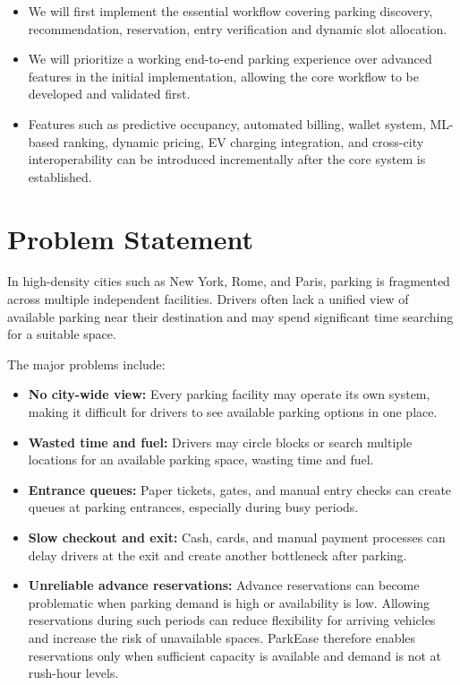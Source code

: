\documentclass[12pt,a4paper]{article}
\begin{document}
\begin{itemize}
    \item We will first implement the essential workflow covering parking discovery, recommendation, reservation, entry verification and dynamic slot allocation.

    \item We will prioritize a working end-to-end parking experience over advanced features in the initial implementation, allowing the core workflow to be developed and validated first.

    \item Features such as predictive occupancy, automated billing, wallet system, ML-based ranking, dynamic pricing, EV charging integration, and cross-city interoperability can be introduced incrementally after the core system is established.
\end{itemize}

\newpage
\section{Problem Statement}

In high-density cities such as New York, Rome, and Paris, parking is fragmented across multiple independent facilities. Drivers often lack a unified view of available parking near their destination and may spend significant time searching for a suitable space.

The major problems include:

\begin{itemize}
    \item \textbf{No city-wide view:} Every parking facility may operate its own system, making it difficult for drivers to see available parking options in one place.

    \item \textbf{Wasted time and fuel:} Drivers may circle blocks or search multiple locations for an available parking space, wasting time and fuel.

    \item \textbf{Entrance queues:} Paper tickets, gates, and manual entry checks can create queues at parking entrances, especially during busy periods.

    \item \textbf{Slow checkout and exit:} Cash, cards, and manual payment processes can delay drivers at the exit and create another bottleneck after parking.

    \item \textbf{Unreliable advance reservations:} Advance reservations can become problematic when parking demand is high or availability is low. Allowing reservations during such periods can reduce flexibility for arriving vehicles and increase the risk of unavailable spaces. ParkEase therefore enables reservations only when sufficient capacity is available and demand is not at rush-hour levels.
\end{itemize}
\end{document}
